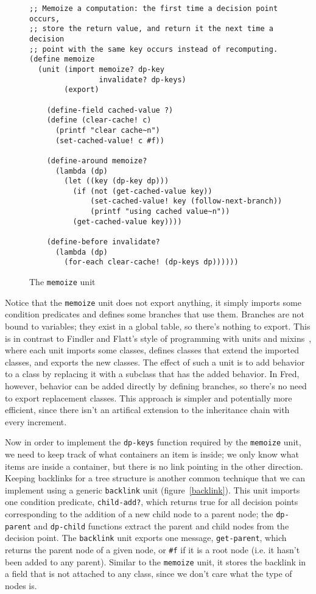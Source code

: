 \documentclass{article}
\newcommand{\code}[1]{\texttt{#1}}
\begin{document}
\begin{figure}
\caption{The \code{memoize} unit}
\label{memoize}
\begin{verbatim}
;; Memoize a computation: the first time a decision point occurs,
;; store the return value, and return it the next time a decision
;; point with the same key occurs instead of recomputing.
(define memoize
  (unit (import memoize? dp-key
                invalidate? dp-keys)
        (export)

    (define-field cached-value ?)
    (define (clear-cache! c)
      (printf "clear cache~n")
      (set-cached-value! c #f))

    (define-around memoize?
      (lambda (dp)
        (let ((key (dp-key dp)))
          (if (not (get-cached-value key))
              (set-cached-value! key (follow-next-branch))
              (printf "using cached value~n"))
          (get-cached-value key))))

    (define-before invalidate?
      (lambda (dp)
        (for-each clear-cache! (dp-keys dp))))))
\end{verbatim}
\end{figure}

Notice that the \code{memoize} unit does not export anything, it
simply imports some condition predicates and defines some branches
that use them.  Branches are not bound to variables; they exist in a
global table, so there's nothing to export.  This is in contrast to
Findler and Flatt's style of programming with units and
mixins~\cite{units-mixins}, where each unit imports some classes,
defines classes that extend the imported classes, and exports the new
classes.  The effect of such a unit is to add behavior to a class by
replacing it with a subclass that has the added behavior.  In Fred,
however, behavior can be added directly by defining branches, so
there's no need to export replacement classes.  This approach is
simpler and potentially more efficient, since there isn't an artifical
extension to the inheritance chain with every increment.

Now in order to implement the \code{dp-keys} function required by the
\code{memoize} unit, we need to keep track of what containers an item
is inside; we only know what items are inside a container, but there
is no link pointing in the other direction.  Keeping backlinks for a
tree structure is another common technique that we can implement using
a generic \code{backlink} unit (figure~\ref{backlink}).  This unit
imports one condition predicate, \code{child-add?}, which returns true
for all decision points corresponding to the addition of a new child
node to a parent node; the \code{dp-parent} and \code{dp-child}
functions extract the parent and child nodes from the decision point.
The \code{backlink} unit exports one message, \code{get-parent}, which
returns the parent node of a given node, or \code{\#f} if it is a root
node (i.e. it hasn't been added to any parent).  Similar to the
\code{memoize} unit, it stores the backlink in a field that is not
attached to any class, since we don't care what the type of nodes is.
\end{document}
